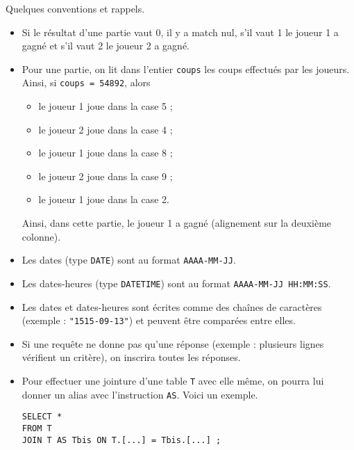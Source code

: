 Quelques conventions et rappels.
\begin{itemize}
  \item Si le résultat d'une partie vaut 0, il y a match nul, s'il vaut 1 le joueur 1 a gagné et s'il vaut 2 le joueur 2 a gagné.
  \item Pour une partie, on lit dans l'entier \texttt{coups} les coups effectués par les joueurs. Ainsi, si \texttt{coups = 54892}, alors 
    \begin{itemize}
      \item le joueur 1 joue dans la case 5 ;
      \item le joueur 2 joue dans la case 4 ;
      \item le joueur 1 joue dans la case 8 ;
      \item le joueur 2 joue dans la case 9 ;
      \item le joueur 1 joue dans la case 2.
    \end{itemize}
    Ainsi, dans cette partie, le joueur 1 a gagné (alignement sur la deuxième colonne). 
  \item Les dates (type \texttt{DATE}) sont au format \texttt{AAAA-MM-JJ}.
  \item Les dates-heures (type \texttt{DATETIME}) sont au format \texttt{AAAA-MM-JJ HH:MM:SS}. 
  \item Les dates et dates-heures sont écrites comme des chaînes de caractères (exemple : \texttt{"1515-09-13"}) et peuvent être comparées entre elles. 
  \item Si une requête ne donne pas qu'une réponse (exemple : plusieurs lignes vérifient un critère), on inscrira toutes les réponses. 
  \item Pour effectuer une jointure d'une table \texttt{T} avec elle même, on pourra lui donner un alias avec l'instruction \texttt{AS}. Voici un exemple.
\begin{lstlisting}
SELECT *
FROM T
JOIN T AS Tbis ON T.[...] = Tbis.[...] ;
\end{lstlisting}
\end{itemize}

